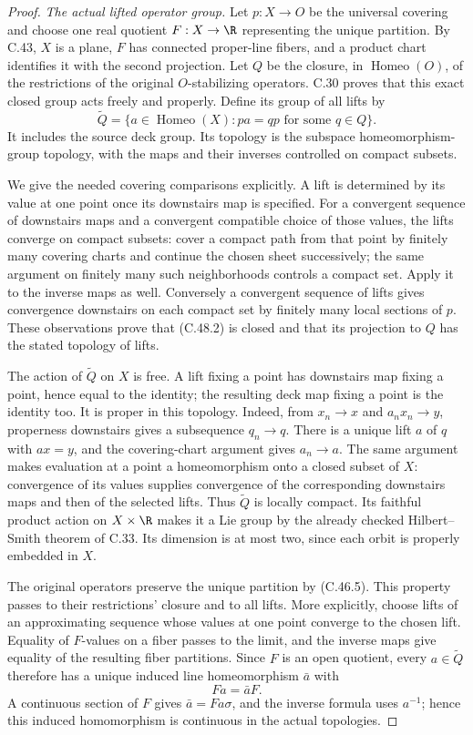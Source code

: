 \begin{proof}
\emph{The actual lifted operator group.}
Let $p:X\to O$ be the universal covering and choose one
real quotient $F:X\to\R$ representing the unique partition.
By C.43, $X$ is a plane, $F$ has connected proper-line fibers,
and a product chart identifies it with the second projection.
Let $Q$ be the closure, in $\operatorname{Homeo}(O)$, of the
restrictions of the original $O$-stabilizing operators.
C.30 proves that this exact closed group acts freely and
properly. Define its group of all lifts by
\[
 \widetilde Q=
 \{a\in\operatorname{Homeo}(X):pa=qp\text{ for some }q\in Q\}.
                                                        \tag{C.48.2}
\]
It includes the source deck group. Its topology is the
subspace homeomorphism-group topology, with the maps and
their inverses controlled on compact subsets.

We give the needed covering comparisons explicitly.
A lift is determined by its value at one point once its
downstairs map is specified. For a convergent sequence of
downstairs maps and a convergent compatible choice of those
values, the lifts converge on compact subsets: cover a
compact path from that point by finitely many covering
charts and continue the chosen sheet successively; the
same argument on finitely many such neighborhoods controls
a compact set. Apply it to the inverse maps as well.
Conversely a convergent sequence of lifts gives convergence
downstairs on each compact set by finitely many local
sections of $p$. These observations prove that (C.48.2) is
closed and that its projection to $Q$ has the stated
topology of lifts.

The action of $\widetilde Q$ on $X$ is free. A lift fixing
a point has downstairs map fixing a point, hence equal to
the identity; the resulting deck map fixing a point is the
identity too. It is proper in this topology. Indeed, from
$x_n\to x$ and $a_nx_n\to y$, properness downstairs gives
a subsequence $q_n\to q$. There is a unique lift $a$ of $q$
with $ax=y$, and the covering-chart argument gives
$a_n\to a$. The same argument makes evaluation at a point
a homeomorphism onto a closed subset of $X$: convergence
of its values supplies convergence of the corresponding
downstairs maps and then of the selected lifts.
Thus $\widetilde Q$ is locally compact. Its faithful product
action on $X\times\R$ makes it a Lie group by the already
checked Hilbert--Smith theorem of C.33. Its dimension is
at most two, since each orbit is properly embedded in $X$.

The original operators preserve the unique partition by
(C.46.5). This property passes to their restrictions'
closure and to all lifts. More explicitly, choose lifts
of an approximating sequence whose values at one point
converge to the chosen lift. Equality of $F$-values on a
fiber passes to the limit, and the inverse maps give
equality of the resulting fiber partitions. Since $F$ is
an open quotient, every $a\in\widetilde Q$ therefore has a
unique induced line homeomorphism $\bar a$ with
\[
                         Fa=\bar aF.                   \tag{C.48.3}
\]
A continuous section of $F$ gives $\bar a=Fa\sigma$, and
the inverse formula uses $a^{-1}$; hence this induced
homomorphism is continuous in the actual topologies.


\end{proof}
